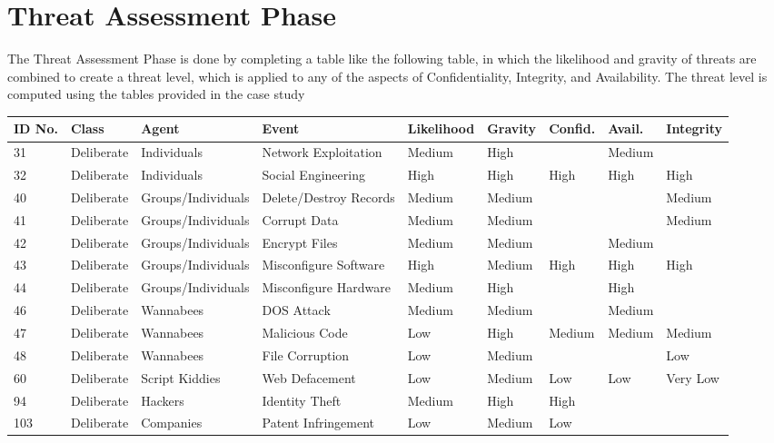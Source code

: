 \documentclass{article}
\numberwithin{equation}{section} %
\numberwithin{figure}{section} %
\numberwithin{table}{section} %
\begin{document}
\section{Threat Assessment Phase}
The Threat Assessment Phase is done by completing a table like the following table, in which the likelihood and gravity of threats are combined to create a threat level, which is applied to any of the aspects of Confidentiality, Integrity, and Availability.  The threat level is computed using the tables provided in the case study\cite{caseStudy}
\small
\begin{center}
\label{tab:tap}
\begin{adjustwidth}{-4.3cm}{}
    \begin{tabular}{ l | l | l | l | l | l | l | l | l} 
    \hline
    ID No. & Class & Agent & Event & Likelihood & Gravity & Confid. & Avail. & Integrity \\
    \hline\hline
    31 & Deliberate & Individuals & Network Exploitation & Medium & High &  & Medium &  \\ 
    32 & Deliberate & Individuals & Social Engineering & High & High & High & High & High \\
    40 & Deliberate & Groups/Individuals & Delete/Destroy Records & Medium & Medium &  &  & Medium \\
    41 & Deliberate & Groups/Individuals & Corrupt Data & Medium & Medium &  &  & Medium \\
    42 & Deliberate & Groups/Individuals & Encrypt Files & Medium & Medium &  & Medium &  \\
    43 & Deliberate & Groups/Individuals & Misconfigure Software & High & Medium & High & High & High \\
    44 & Deliberate & Groups/Individuals & Misconfigure Hardware & Medium & High &  & High &  \\
    46 & Deliberate & Wannabees & DOS Attack & Medium & Medium &  & Medium &  \\
    47 & Deliberate & Wannabees & Malicious Code & Low & High & Medium & Medium & Medium \\
    48 & Deliberate & Wannabees & File Corruption & Low & Medium &  &  & Low \\
    60 & Deliberate & Script Kiddies & Web Defacement & Low & Medium & Low & Low & Very Low \\
    94 & Deliberate & Hackers & Identity Theft & Medium & High & High &  &  \\
    103 & Deliberate & Companies & Patent Infringement & Low & Medium & Low &  &  \\

\end{tabular}
\end{adjustwidth}
\end{center}
\end{document}
